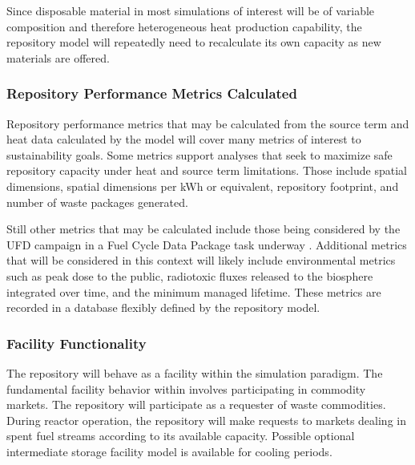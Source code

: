 Since disposable material in most simulations of interest will be of variable 
composition and therefore heterogeneous heat production capability, the 
repository model will repeatedly need to recalculate its own capacity as 
new materials are offered.

\subsubsection{Repository Performance Metrics Calculated}

Repository performance metrics that may be calculated from the source 
term and heat data calculated by the model will cover many metrics of
interest to sustainability goals. Some metrics support analyses that
seek to maximize safe repository capacity under heat and source term limitations. 
Those include spatial dimensions, spatial dimensions per kWh or equivalent,
repository footprint, and number of waste packages generated.

Still other metrics that may be calculated include those being considered by 
the \gls{UFD} campaign in a Fuel Cycle Data Package task underway 
\cite{nutt_personal_2011}. Additional metrics that will be considered in this
context will likely include environmental metrics such as peak dose 
to the public, radiotoxic fluxes released to the biosphere integrated over time, 
and the minimum managed lifetime.  These metrics are recorded in a database 
flexibly defined by the repository model. 

\subsubsection{Facility Functionality}

The repository will behave as a facility within the \Cyclus simulation 
paradigm. The fundamental facility behavior within \Cyclus involves 
participating in commodity markets. The repository will participate as 
a requester of waste commodities. During reactor operation, the 
repository will make requests to markets dealing in spent fuel streams 
according to its available capacity. Possible optional intermediate storage facility 
model is available for cooling periods.

